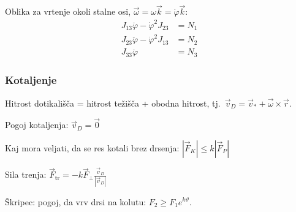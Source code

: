 \documentclass[a4paper,10pt]{article}
\theoremstyle{definition}
\let\theta\vartheta
\newcommand{\vomega}{\vec{\omega}}
\begin{document}
Oblika za vrtenje okoli stalne osi, $\vomega = \omega \vec{k} = \dot{\varphi} \vec{k}$:
\begin{align*}
  J_{13} \ddot{\varphi} - \dot{\varphi}^2 J_{23} &= N_1 \\
  J_{23} \ddot{\varphi} - \dot{\varphi}^2 J_{13} &= N_2 \\
  J_{33} \ddot{\varphi}  &= N_3
\end{align*}

\subsubsection*{Kotaljenje}
Hitrost dotikališča = hitrost težišča + obodna hitrost, tj.\ $\vec{v}_D = \vec{v}_* + \vec{\omega} \times \vec{r}$.

Pogoj kotaljenja: $\vec{v}_D = \vec{0}$

Kaj mora veljati, da se res kotali brez drsenja: $|\vec{F}_K| \leq k |\vec{F}_P|$

Sila trenja: $\vec{F}_{\operatorname{tr}} = - k \vec{F}_{\perp} \frac{\vec{v}_D}{|\vec{v}_D|}$

Škripec: pogoj, da vrv drsi na kolutu: $F_2 \ge F_1 e^{k \theta}$.
\end{document}
